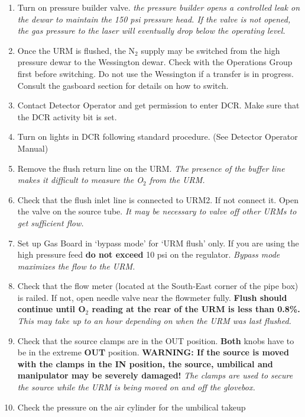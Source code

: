 \begin{enumerate}
\item \CheckBox[name=encp7]{} Turn on pressure builder valve. {\it the pressure builder opens
  a controlled leak on the dewar to maintain the 150 psi pressure
  head. If the valve is not opened, the gas pressure to the laser
  will eventually drop below the operating level.}
\item \CheckBox[name=encp8]{} Once the URM is flushed, the N$_{2}$ supply may be switched
  from the high pressure dewar to the Wessington dewar. Check with
  the Operations Group first before switching. Do not use the
  Wessington if a transfer is in progress. Consult the gasboard
  section for details on how to switch.
\item \CheckBox[name=encp9]{} Contact Detector Operator and get permission to enter DCR. Make
  sure that the DCR activity bit is set.
\item \CheckBox[name=encp10]{} Turn on lights in DCR following standard procedure. (See
  Detector Operator Manual)
\item \CheckBox[name=encp1]{} Remove the flush return line on the URM. {\it The presence of the
  buffer line makes it difficult to measure the O$_{2}$ from the URM.}
\item \CheckBox[name=encp11]{} Check that the flush inlet line is connected to URM2. If not
  connect it. Open the valve on the source tube. {\it It may be
    necessary to valve off other URMs to get sufficient flow.}
\item \CheckBox[name=encp12]{} Set up Gas Board in `bypass mode' for `URM flush' only. If you
  are using the high pressure feed {\bf do not exceed} 10 psi on the
  regulator. {\it Bypass mode maximizes the flow to the URM.}
\item \CheckBox[name=encp13]{} Check that the flow meter (located at the South-East corner of
  the pipe box) is railed. If not, open needle valve near the
  flowmeter fully. {\bf Flush should continue until O$_2$ reading at
    the rear of the URM is less than 0.8\%.} {\it This may take up to
    an hour depending on when the URM was last flushed.}
\item \CheckBox[name=encp14]{} Check that the source clamps are in the OUT position. {\bf Both}
  knobs have to be in the extreme {\bf OUT} position. {\bf WARNING: If
    the source is moved with the clamps in the IN position, the
    source, umbilical and manipulator may be severely damaged!} {\it
    The clamps are used to secure the source while the URM is being
    moved on and off the glovebox.}
\item \CheckBox[name=encp15]{} Check the pressure on the air cylinder for the umbilical takeup

\end{enumerate}
